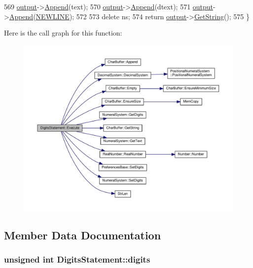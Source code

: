 \begin{DoxyCode}
569     \hyperlink{classSyntaxNode_a1180628cbe3fce43930cee0df5a9ce5c}{output}->\hyperlink{classCharBuffer_a045b38735f7b3007c1b98d3d7b7feafe}{Append}(text);
570     \hyperlink{classSyntaxNode_a1180628cbe3fce43930cee0df5a9ce5c}{output}->\hyperlink{classCharBuffer_a045b38735f7b3007c1b98d3d7b7feafe}{Append}(dtext);
571     \hyperlink{classSyntaxNode_a1180628cbe3fce43930cee0df5a9ce5c}{output}->\hyperlink{classCharBuffer_a045b38735f7b3007c1b98d3d7b7feafe}{Append}(\hyperlink{platform_8h_a806511f4930171733227c99101dc0606}{NEWLINE});
572 
573     \textcolor{keyword}{delete} ns;
574     \textcolor{keywordflow}{return} \hyperlink{classSyntaxNode_a1180628cbe3fce43930cee0df5a9ce5c}{output}->\hyperlink{classCharBuffer_a7dfd3feaaf80f318ba44efe15b1ec44b}{GetString}();
575 \}
\end{DoxyCode}


Here is the call graph for this function\+:
\nopagebreak
\begin{figure}[H]
\begin{center}
\leavevmode
\includegraphics[width=350pt]{d6/dab/classDigitsStatement_a5a16b621b4759cdc0bf980b01858350b_cgraph}
\end{center}
\end{figure}




\subsection{Member Data Documentation}
\subsubsection[{\texorpdfstring{digits}{digits}}]{\setlength{\rightskip}{0pt plus 5cm}unsigned int Digits\+Statement\+::digits\hspace{0.3cm}{\ttfamily [private]}}\hypertarget{classDigitsStatement_a9d71ae96bc7bcd432deb9e4700e89550}{}\label{classDigitsStatement_a9d71ae96bc7bcd432deb9e4700e89550}


